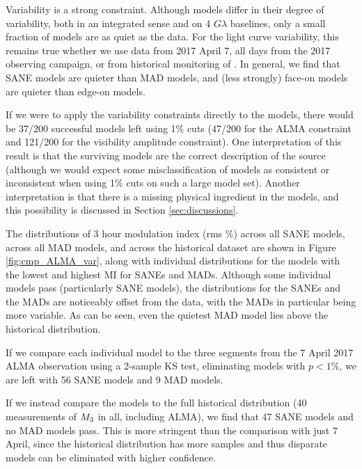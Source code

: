 Variability is a strong constraint.  Although models differ in their degree of variability, both in an integrated sense and on 4 $G\lambda$ baselines, only a small fraction of models are as quiet as the data.  For the light curve variability, this remains true whether we use data from 2017 April 7, all days from the 2017 observing campaign, or from historical monitoring of \sgra.   In general, we find that SANE models are quieter than MAD models, and (less strongly) face-on models are quieter than edge-on models.

If we were to apply the variability constraints directly to the models, there would be 37/200 successful models left using 1\% cuts (47/200 for the ALMA constraint and 121/200 for the visibility amplitude constraint).  One interpretation of this result is that the surviving models are the correct description of the source (although we would expect some misclassification of models as consistent or inconsistent when using 1\% cuts on such a large model set).  Another interpretation is that there is a missing physical ingredient in the models, and this possibility is discussed in Section \ref{sec:discussions}.


The distributions of 3 hour modulation index (rms \%) across all SANE models, across all MAD models, and across the historical dataset are shown in Figure \ref{fig:cmp_ALMA_var}, along with individual distributions for the models with the lowest and highest MI for SANEs and MADs. Although some individual models  pass (particularly SANE models), the distributions for the SANEs and the MADs are noticeably offset from the data, with the MADs in particular being more variable. As can be seen, even the quietest MAD model lies above the historical distribution.

If we compare each individual model to the three segments from the 7 April 2017 ALMA observation using a 2-sample KS test, eliminating models with $p < 1\%$, we are left with 56 SANE models and 9 MAD models.

If we instead compare the models to the full historical distribution (40 measurements of $M_{3}$ in all, including ALMA), we find that 47 SANE models and no MAD models pass. This is more stringent than the comparison with just 7 April, since the historical distribution has more samples and thus disparate models can be eliminated with higher confidence.

